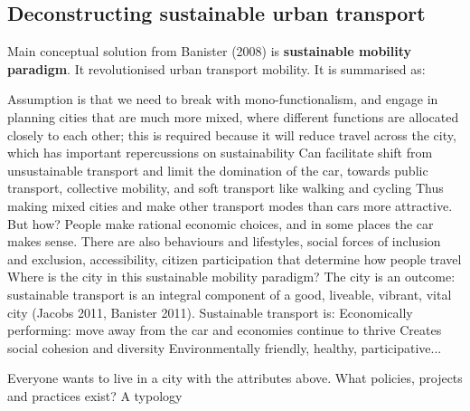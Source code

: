 \documentclass{article}
\begin{document}
\subsection{Deconstructing sustainable urban transport}

Main conceptual solution from Banister (2008) is \textbf{sustainable mobility paradigm}. It revolutionised urban transport mobility.
It is summarised as:

\begin{outline}
	\1 Assumption is that we need to break with mono-functionalism, and engage in planning cities that are much more mixed, where different functions are allocated closely to each other; this is required because it will reduce travel across the city, which has important repercussions on sustainability
	\1 Can facilitate shift from unsustainable transport and limit the domination of the car, towards public transport, collective mobility, and soft transport like walking and cycling
	\1 Thus making mixed cities and make other transport modes than cars more attractive. But how?
	\1 People make rational economic choices, and in some places the car makes sense. There are also behaviours and lifestyles, social forces of inclusion and exclusion, accessibility, citizen participation that determine how people travel
	\1 Where is the city in this sustainable mobility paradigm?
		\2 The city is an outcome: sustainable transport is an integral component of a good, liveable, vibrant, vital city (Jacobs 2011, Banister 2011). Sustainable transport is:
		\2 Economically performing: move away from the car and economies continue to thrive
		\2 Creates social cohesion and diversity
		\2 Environmentally friendly, healthy, participative... 
\end{outline}

Everyone wants to live in a city with the attributes above. What policies, projects and practices exist? A typology
\end{document}
